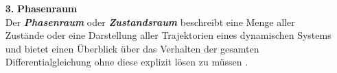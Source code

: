 \begin{itemize}
    \item[\textbf{3.}]\textbf{Phasenraum}\\
    Der \textit{\textbf{Phasenraum}} oder \textit{\textbf{Zustandsraum}} beschreibt eine Menge aller Zustände oder eine Darstellung aller Trajektorien eines dynamischen Systems und bietet einen Überblick über das Verhalten der gesamten Differentialgleichung ohne diese explizit lösen zu müssen \citep{Mat1}.


\end{itemize}
